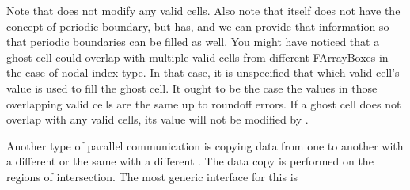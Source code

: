 \documentclass[letterpaper,10pt,english]{sphinxmanual}
\begin{document}
\begin{sphinxVerbatim}[commandchars=\\\{\}]
  
  
                    
  
         
  
\end{sphinxVerbatim}

\sphinxAtStartPar
Note that  does not modify any valid cells. Also note that
 itself does not have the concept of periodic boundary, but
 has, and we can provide that information so that periodic
boundaries can be filled as well. You might have noticed that a ghost cell
could overlap with multiple valid cells from different FArrayBoxes in the case
of nodal index type. In that case, it is unspecified that which valid cell’s
value is used to fill the ghost cell. It ought to be the case the values in
those overlapping valid cells are the same up to roundoff errors.  If
a ghost cell does not overlap with any valid cells, its value will not
be modified by .

\sphinxAtStartPar
Another type of parallel communication is copying data from one 
to another  with a different  or the same
 with a different . The data copy is
performed on the regions of intersection. The most generic interface for this
is
\end{document}

